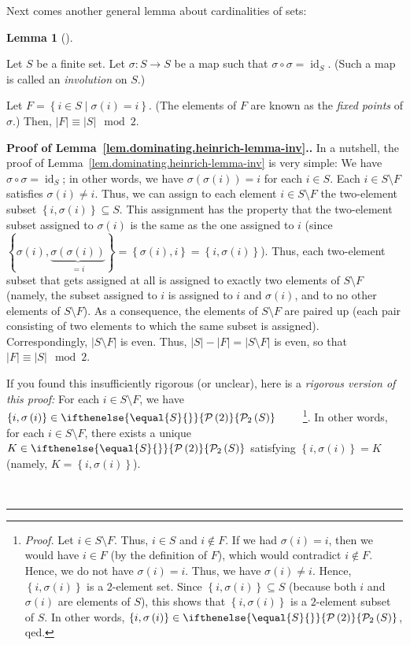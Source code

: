 \documentclass[numbers=enddot,12pt,final,onecolumn,notitlepage]{scrartcl}%
\theoremstyle{definition}
\newtheorem{lem}[theo]{Lemma}
\newenvironment{lemma}[1][]
{\begin{lem}[#1]\begin{leftbar}}
{\end{leftbar}\end{lem}}
\newenvironment{proof}[1][Proof]{\noindent\textbf{#1.} }{\ \rule{0.5em}{0.5em}}
\newcommand{\id}{\operatorname{id}}
\newcommand{\powset}[2][]{\ifthenelse{\equal{#2}{}}{\mathcal{P}\left(#1\right)}{\mathcal{P}_{#1}\left(#2\right)}}
\newcommand{\set}[1]{\left\{ #1 \right\}}
\newcommand{\abs}[1]{\left| #1 \right|}
\newcommand{\tup}[1]{\left( #1 \right)}
\begin{document}
Next comes another general lemma about cardinalities of sets:

\begin{lemma} \label{lem.dominating.heinrich-lemma-inv}
Let $S$ be a finite set. Let $\sigma : S \to S$ be a map such that
$\sigma \circ \sigma = \id_S$. (Such a map is called an
\textit{involution} on $S$.)

Let $F = \set{ i \in S \mid \sigma\tup{i} = i }$. (The elements of $F$
are known as the \textit{fixed points} of $\sigma$.) Then,
$\abs{F} \equiv \abs{S} \mod 2$.
\end{lemma}

\begin{proof}[Proof of Lemma~\ref{lem.dominating.heinrich-lemma-inv}.]
In a nutshell, the proof of
Lemma~\ref{lem.dominating.heinrich-lemma-inv} is very simple: We have
$\sigma \circ \sigma = \id_S$; in other words, we have
$\sigma\tup{\sigma\tup{i}} = i$ for each $i \in S$. Each
$i \in S \setminus F$ satisfies $\sigma\tup{i} \neq i$. Thus, we can
assign to each element $i \in S \setminus F$ the two-element subset
$\set{i, \sigma\tup{i}} \subseteq S$. This assignment has the property
that the two-element subset assigned to $\sigma\tup{i}$ is the same
as the one assigned to $i$ (since
$\set{\sigma\tup{i}, \underbrace{\sigma\tup{\sigma\tup{i}}}_{= i}}
= \set{\sigma\tup{i}, i} = \set{i, \sigma\tup{i}}$).
Thus, each two-element subset
that gets assigned at all is assigned to exactly two elements of
$S \setminus F$ (namely, the subset assigned to $i$ is assigned to
$i$ and $\sigma\tup{i}$, and to no other elements of
$S \setminus F$).
As a consequence, the elements of $S \setminus F$ are paired up
(each pair consisting of two elements to which the same subset is
assigned). Correspondingly, $\abs{S \setminus F}$ is even. Thus,
$\abs{S} - \abs{F} = \abs{S \setminus F}$ is even, so that
$\abs{F} \equiv \abs{S} \mod 2$.

If you found this insufficiently rigorous (or unclear), here is a
\textit{rigorous version of this proof:}
For each $i \in S \setminus F$, we have
$\set{i, \sigma\tup{i}} \in \powset[2]{S}$
\ \ \ \ \footnote{\textit{Proof.} Let $i \in S \setminus F$. Thus,
$i \in S$ and $i \notin F$. If we had $\sigma\tup{i} = i$, then we
would have $i \in F$ (by the definition of $F$), which would
contradict $i \notin F$. Hence, we do not have
$\sigma\tup{i} = i$. Thus, we have $\sigma\tup{i} \neq i$. Hence,
$\set{i, \sigma\tup{i}}$ is a $2$-element set. Since
$\set{i, \sigma\tup{i}} \subseteq S$ (because both $i$ and
$\sigma\tup{i}$ are elements of $S$), this shows that
$\set{i, \sigma\tup{i}}$ is a $2$-element subset of $S$. In other
words, $\set{i, \sigma\tup{i}} \in \powset[2]{S}$, qed.}. In other
words, for each $i \in S \setminus F$, there exists a unique
$K \in \powset[2]{S}$ satisfying $\set{i, \sigma\tup{i}} = K$
(namely, $K = \set{i, \sigma\tup{i}}$).


\end{proof}
\end{document}
